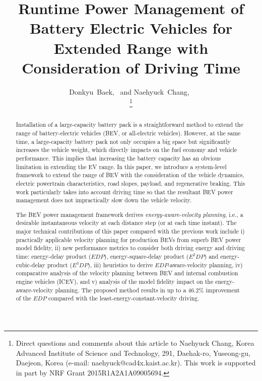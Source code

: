 \documentclass{IEEEtran}
\begin{document}
\title{Runtime Power Management of Battery Electric Vehicles for Extended Range with Consideration of Driving Time}

\author{
Donkyu~Baek,~
and
Naehyuck~Chang,~

\thanks{Direct questions and comments about this article to Naehyuck Chang, Korea Advanced Institute of Science and Technology, 291, Daehak-ro, Yuseong-gu, Daejeon, Korea (e-mail: naehyuck@cad4x.kaist.ac.kr). This work is supported in part by NRF Grant 2015R1A2A1A09005694.}
}

\maketitle


\begin{abstract}
Installation of a large-capacity battery pack is a straightforward method to extend the range of battery-electric vehicles (BEV, or all-electric vehicles). However, at the same time, a large-capacity battery pack not only occupies a big space but significantly increases the vehicle weight, which directly impacts on the fuel economy and vehicle performance. This implies that increasing the battery capacity has an obvious limitation in extending the EV range. 
In this paper, we introduce a system-level framework to extend the range of BEV with the consideration of the vehicle dynamics, electric powertrain characteristics, road slopes, payload, and regenerative braking. This work particularly takes into account driving time so that the resultant BEV power management does not impractically slow down the vehicle velocity. 

The BEV power management framework derives \textit{energy-aware-velocity planning}, i.e., a desirable instantaneous velocity at each distance step (or at each time instant). The major technical contributions of this paper compared with the previous work include i) practically applicable velocity planning for production BEVs from superb BEV power model fidelity, ii) new performance metrics to consider both driving energy and driving time: energy-delay product ($EDP$), energy-square-delay product ($E^2DP$) and energy-cubic-delay product ($E^3DP$), iii) heuristics to derive $EDP$-aware-velocity planning, iv) comparative analysis of the velocity planning between BEV and internal combustion engine vehicles (ICEV), and v) analysis of the model fidelity impact on the energy-aware-velocity planning. The proposed method results in up to a 46.2\% improvement of the $EDP$ compared with the least-energy-constant-velocity driving.
\end{abstract}
\end{document}
